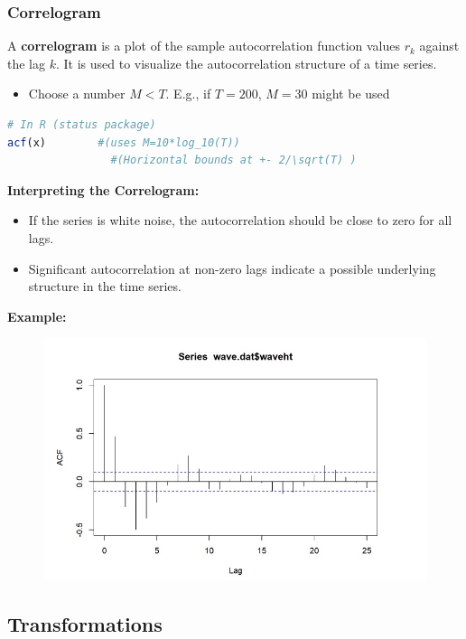 \subsubsection{Correlogram}

A \textbf{correlogram} is a plot of the sample autocorrelation function values $r_k$ against the lag $k$. It is used to visualize the autocorrelation structure of a time series.

\begin{itemize}
    \item Choose a number $M<T$. E.g., if $T=200$, $M=30$ might be used
\end{itemize}

\begin{lstlisting}[language=R]
# In R (status package)
acf(x)        #(uses M=10*log_10(T))
                #(Horizontal bounds at +- 2/\sqrt(T) )
\end{lstlisting}

\textbf{Interpreting the Correlogram:}
\begin{itemize}
    \item If the series is white noise, the autocorrelation should be close to zero for all lags.
    \item Significant autocorrelation at non-zero lags indicate a possible underlying structure in the time series.
\end{itemize}

\textbf{Example:}

\begin{figure}[H]
\includegraphics[scale=0.4]{images/Screenshot 2024-03-30 at 17.42.36.jpg}
\centering
\end{figure}


\subsection{Transformations}

